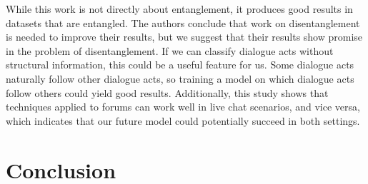 \documentclass[11pt]{article}
\begin{document}
While this work is not directly about entanglement, it produces good results in
datasets that are entangled. The authors conclude that work on
disentanglement is needed to improve their results, but we suggest that their
results show promise in the problem of disentanglement. If we can classify
dialogue acts without structural information, this could be a useful feature
for us. Some dialogue acts naturally follow other dialogue acts, so training a
model on which dialogue acts follow others could yield good results.
Additionally, this study shows that techniques applied to forums can work well
in live chat scenarios, and vice versa, which indicates that our future model
could potentially succeed in both settings.

\section{Conclusion}

{} 
\end{document}
